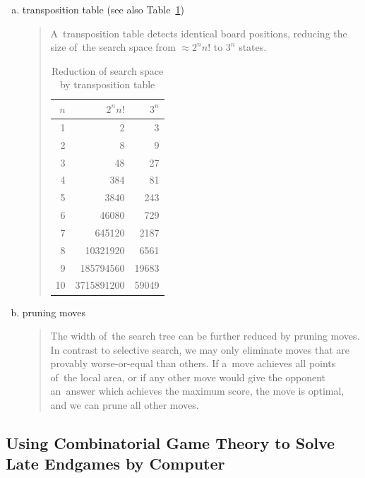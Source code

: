 \begin{enumerate}[(a)]
  \item transposition table (see also Table~\ref{tab:reduction-transp-tab})
    \begin{quotation} \noindent
      A~transposition table detects identical board positions, reducing the size of~the search space from $\approx 2^n n!$ to $3^n$ states.

      \begin{table}[!htbp]
        \centering
        \begin{tabular}{ |rrr| }
          \hline
          \textbf{$n$} & \textbf{$2^nn!$} & \textbf{$3^n$} \\
          \hline
          1	&	2	&	3 \\ 
          2	&	8	&	9 \\ 
          3	&	48	&	27 \\ 
          4	&	384	&	81 \\ 
          5	&	3840	&	243 \\ 
          6	&	46080	&	729 \\ 
          7	&	645120	&	2187 \\ 
          8	&	10321920	&	6561 \\ 
          9	&	185794560	&	19683 \\ 
          10	&	3715891200	&	59049 \\ 
          \hline
        \end{tabular}
        \caption{Reduction of search space by transposition table}
        \label{tab:reduction-transp-tab}
      \end{table}
    \end{quotation}

  \item pruning moves
    \begin{quotation} \noindent
      The width of~the search tree can be further reduced by pruning moves.
      In contrast to selective search, we may only eliminate moves that are provably worse-or-equal than others.
      If a~move achieves all points of~the local area, or if any other move would give the opponent an~answer which achieves the maximum score, the move is optimal, and we can prune all other moves.
    \end{quotation}
\end{enumerate}

\subsection{Using Combinatorial Game Theory to Solve Late Endgames by Computer}

